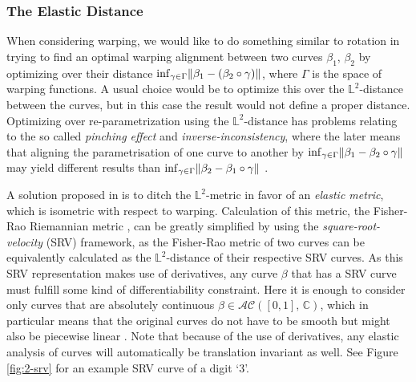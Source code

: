 \subsubsection*{The Elastic Distance}
When considering warping, we would like to do something similar to rotation in trying to find an optimal warping alignment between two curves $\beta_1$, $\beta_2$ by optimizing over their distance $\inf_{\gamma \in \Gamma} \lVert\beta_1 - (\beta_2 \circ \gamma)\rVert$, where $\Gamma$ is the space of warping functions.
A usual choice would be to optimize this over the $\mathbb{L}^2$-distance between the curves, but in this case the result would not define a proper distance.
Optimizing over re-parametrization using the $\mathbb{L}^2$-distance has problems relating to the so called \emph{pinching effect} and \emph{inverse-inconsistency}, where the later means that aligning the parametrisation of one curve to another by $\inf_{\gamma \in \Gamma} \lVert\beta_1 - \beta_2 \circ \gamma\rVert$ may yield different results than $\inf_{\gamma \in \Gamma} \lVert\beta_2 - \beta_1 \circ \gamma\rVert$ \parencite[see][88-90]{SrivastavaKlassen2016}.

A solution proposed in \cite{SrivastavaEtAl2011} is to ditch the $\mathbb{L}^2$-metric in favor of an \emph{elastic metric}, which is isometric with respect to warping.
Calculation of this metric, the Fisher-Rao Riemannian metric \parencite{Rao1945}, can be greatly simplified by using the \emph{square-root-velocity} (SRV) framework, as the Fisher-Rao metric of two curves can be equivalently calculated as the $\mathbb{L}^2$-distance of their respective SRV curves.
As this SRV representation makes use of derivatives, any curve $\beta$ that has a SRV curve must fulfill some kind of differentiability constraint.
Here it is enough to consider only curves that are absolutely continuous $\beta \in \mathcal{AC}([0,1],\, \mathbb{C})$, which in particular means that the original curves do not have to be smooth but might also be piecewise linear \parencite[see][91]{SrivastavaKlassen2016}.
Note that because of the use of derivatives, any elastic analysis of curves will automatically be translation invariant as well.
See Figure \ref{fig:2-srv} for an example SRV curve of a digit \enquote*{3}.

